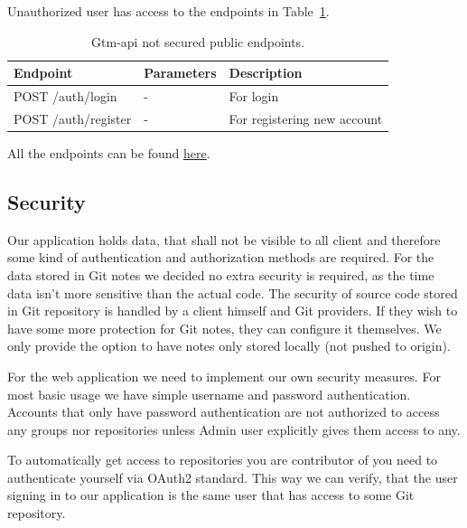 Unauthorized user has access to the endpoints in Table~\ref{tab:gtm-api-endpoints-public}.
\begin{table}[H]
    \centering
    \begin{tabular}{ | p{5cm} | p{4cm} | p{5cm} |}
        \hline
        \textbf{Endpoint} & \textbf{Parameters} & \textbf{Description}\\
        \hline
        POST /auth/login & - & For login \\
        \hline
        POST /auth/register & - & For registering new account \\
        \hline
    \end{tabular}
    \caption{Gtm-api not secured public endpoints.}
    \label{tab:gtm-api-endpoints-public}
\end{table}

All the endpoints can be found \href{https://cs.ttu.ee/services/gtm/api/swagger/index.html}{here}.

\subsection{Security}\label{subsec:scurity}
Our application holds data, that shall not be visible to all client and therefore some kind of authentication and authorization methods are required.
For the data stored in Git notes we decided no extra security is required, as the time data isn't more sensitive than the actual code.
The security of source code stored in Git repository is handled by a client himself and Git providers.
If they wish to have some more protection for Git notes, they can configure it themselves.
We only provide the option to have notes only stored locally (not pushed to origin).

For the web application we need to implement our own security measures.
For most basic usage we have simple username and password authentication.
Accounts that only have password authentication are not authorized to access any groups nor repositories unless Admin user
explicitly gives them access to any.

To automatically get access to repositories you are contributor of you need to authenticate yourself via OAuth2 standard.
This way we can verify, that the user signing in to our application is the same user that has access to some Git repository.

